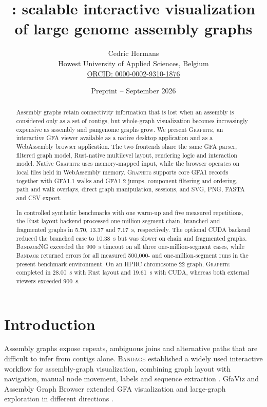 \documentclass[11pt]{article}
\title{\graphite: scalable interactive visualization of large genome assembly graphs}
\author{Cedric Hermans\\
Howest University of Applied Sciences, Belgium\\
\href{https://orcid.org/0000-0002-9310-1876}{ORCID: 0000-0002-9310-1876}}
\date{Preprint -- September 2026}
\newcommand{\graphite}{\textsc{Graphite}\xspace}
\newcommand{\bandage}{\textsc{Bandage}\xspace}
\newcommand{\bandageng}{\textsc{BandageNG}\xspace}
\begin{document}
\maketitle

\begin{abstract}
Assembly graphs retain connectivity information that is lost when an assembly is considered only as a set of contigs, but whole-graph visualization becomes increasingly expensive as assembly and pangenome graphs grow. We present \graphite, an interactive GFA viewer available as a native desktop application and as a WebAssembly browser application. The two frontends share the same GFA parser, filtered graph model, Rust-native multilevel layout, rendering logic and interaction model. Native \graphite uses memory-mapped input, while the browser operates on local files held in WebAssembly memory. \graphite supports core GFA1 records together with GFA1.1 walks and GFA1.2 jumps, component filtering and ordering, path and walk overlays, direct graph manipulation, sessions, and SVG, PNG, FASTA and CSV export.

In controlled synthetic benchmarks with one warm-up and five measured repetitions, the Rust layout backend processed one-million-segment chain, branched and fragmented graphs in 5.70, 13.37 and 7.17~s, respectively. The optional CUDA backend reduced the branched case to 10.38~s but was slower on chain and fragmented graphs. \bandageng exceeded the 900~s timeout on all three one-million-segment cases, while \bandage returned errors for all measured 500,000- and one-million-segment runs in the present benchmark environment. On an HPRC chromosome 22 graph, \graphite completed in 28.00~s with Rust layout and 19.61~s with CUDA, whereas both external viewers exceeded 900~s.
\end{abstract}

\section{Introduction}
Assembly graphs expose repeats, ambiguous joins and alternative paths that are difficult to infer from contigs alone. \bandage established a widely used interactive workflow for assembly-graph visualization, combining graph layout with navigation, manual node movement, labels and sequence extraction \citep{wick2015bandage}. GfaViz and Assembly Graph Browser extended GFA visualization and large-graph exploration in different directions \citep{gonnella2019gfaviz,mikheenko2019agb}.
\end{document}
